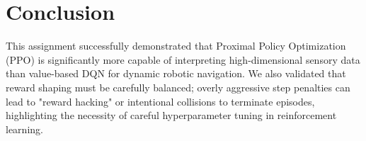 \documentclass{article}
\begin{document}
\section{Conclusion}
This assignment successfully demonstrated that Proximal Policy Optimization (PPO) is significantly more capable of interpreting high-dimensional sensory data than value-based DQN for dynamic robotic navigation. We also validated that reward shaping must be carefully balanced; overly aggressive step penalties can lead to "reward hacking" or intentional collisions to terminate episodes, highlighting the necessity of careful hyperparameter tuning in reinforcement learning.
\end{document}
